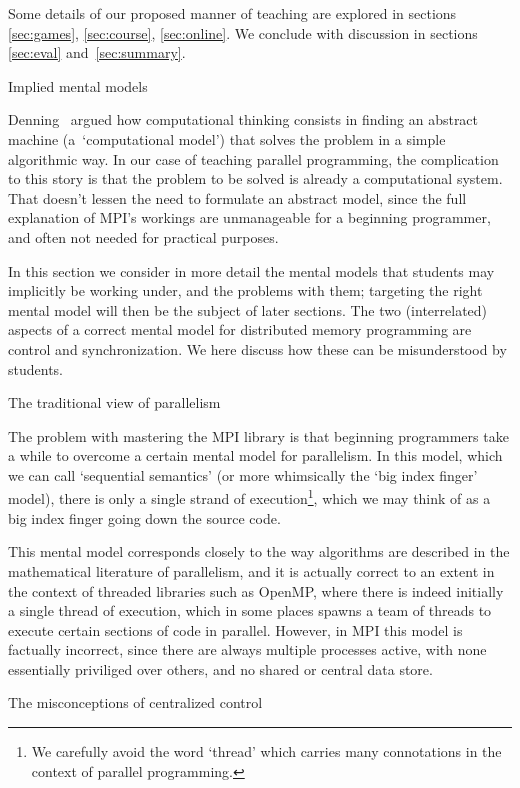 Some details of our proposed manner of teaching are explored in
sections \ref{sec:games}, \ref{sec:course}, \ref{sec:online}. We
conclude with discussion in sections \ref{sec:eval} and~\ref{sec:summary}.

 {Implied mental models}
\label{sec:par-models}

Denning~\cite{Denning:compthinking2017} argued how computational
thinking consists in finding an abstract machine (a~`computational
model') that solves the problem in a simple algorithmic way. In our
case of teaching parallel programming, the complication to this story
is that the problem to be solved is already a computational system.
That doesn't lessen the need to formulate an abstract model, since the
full explanation of MPI's workings are unmanageable for a beginning
programmer, and often not needed for practical purposes.

In this section we consider in more detail the mental models that
students may implicitly be working under, and the problems with them;
targeting the right mental model will then be the subject of later sections. 
The two (interrelated) aspects of a correct mental model for distributed memory
programming are control and synchronization. We here discuss how these
can be misunderstood by students.

 {The traditional view of parallelism}
\label{sec:finger}

The problem with mastering the \ac{MPI} library is that beginning
programmers take a while to overcome a certain mental model for
parallelism.  In this model, which we can call `sequential semantics'
(or more whimsically the `big index finger' model), there is only a
single strand of execution\footnote{We carefully avoid the word
  `thread' which carries many connotations in the context of parallel
  programming.}, which we may think of as a big index finger going
down the source code.

This mental model corresponds closely to the way algorithms are
described in the mathematical literature of parallelism,
and it is actually correct to an extent in the context of threaded libraries such as
OpenMP,
where there is indeed initially a single thread of execution,
which in some places spawns a team of threads to execute certain
sections of code in parallel.
However, in \ac{MPI} this model is factually incorrect,
since there are always multiple processes active,
with none essentially priviliged over others, and no shared or central
data store.

 {The misconceptions of centralized control}
\label{sec:misconception}

